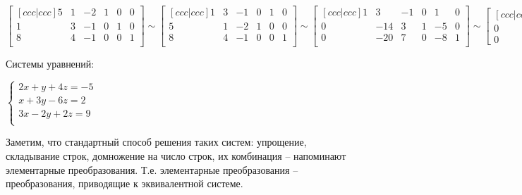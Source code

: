 \documentclass{book}
\theoremstyle{definition}
\begin{document}
\begin{enumerate}
                $\begin{bmatrix}[ccc|ccc]
                    5 & 1 & -2 & 1 & 0 & 0\\ 1 & 3 & -1 & 0 & 1 & 0\\ 8 & 4 & -1 & 0 & 0 & 1\\
                    \end{bmatrix} \sim \begin{bmatrix} [ccc|ccc] 
                1 & 3 & -1 & 0 & 1 & 0\\
                5 & 1 & -2 & 1 & 0 & 0\\
                8 & 4 & -1 & 0 & 0 & 1\\
            \end{bmatrix} \sim \begin{bmatrix} [ccc|ccc] 
                1 & 3 & -1 & 0 & 1 & 0\\
                0 & -14 & 3 & 1 & -5 & 0\\
                0 & -20 & 7 & 0 & -8 & 1\\
            \end{bmatrix}   \sim \begin{bmatrix} [ccc|ccc] 
                1 & 3 & -1 & 0 & 1 & 0\\
                0 & -140 & 30 & 10 & -50 & 0\\
                0 & -140 & 49 & 0 & -56 & 7
            \end{bmatrix}  \sim \begin{bmatrix} [ccc|ccc] 
                1 & 3 & -1 & 0 & 1 & 0\\
                0 & -14 & 3 & 1 & -5 & 0\\
                0 & 0 & 19 & -10 & -6 & 7\\
            \end{bmatrix} \sim \ldots$
        \end{enumerate}

        Системы уравнений:

        $\begin{cases}
            2x+y+4z = -5\\
            x+3y-6z=2\\
            3x-2y+2z=9\\
        \end{cases}$

         Заметим, что стандартный способ решения таких систем: упрощение, складывание строк, домножение на число строк, их комбинация -- напоминают элементарные преобразования. Т.е. элементарные преобразования -- преобразования, приводящие к эквивалентной системе.
\end{document}

